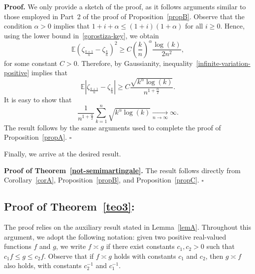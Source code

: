 \documentclass[preprint,12pt,authoryear]{elsarticle}
\def\E{\mathbb{E}}
\begin{document}
\noindent\textbf{Proof.} We only provide a sketch of the proof, as it follows arguments similar to those employed in Part~2 of the proof of Proposition~\ref{propB}. Observe that the condition $\alpha > 0$ implies that $1 + i + \alpha \leq (1 + i)(1 + \alpha)$ for all $i \geq 0$. Hence, using the lower bound in~\eqref{gorostiza-key}, we obtain
\begin{equation}\label{infinite-variation-positive}
   \E\left(\zeta_{\frac{k+1}{n}}-\zeta_{\frac{k}{n}}\right)^2 \geq C  \left(\frac{k}{n}\right)^{\alpha}\frac{\log(k)}{2n^2},
\end{equation}
for some constant $C > 0$. Therefore, by Gaussianity, inequality~\eqref{infinite-variation-positive} implies that
\begin{equation*}
   \E\left|\zeta_{\frac{k+1}{n}}-\zeta_{\frac{k}{n}}\right| \geq C \frac{\sqrt{k^\alpha\log(k)}}{n^{1+\frac{\alpha}{2}}}.
\end{equation*}
It is easy to show that
\[
\frac{1}{n^{1 + \frac{\alpha}{2}}} \sum_{k = 1}^{n} \sqrt{k^{\alpha} \log(k)} \xrightarrow[n \to \infty]{} \infty.
\]
The result follows by the same arguments used to complete the proof of Proposition~\ref{propA}.
\hfill$\square$

Finally, we arrive at the desired result.  

\noindent\textbf{Proof of Theorem~\ref{not-semimartingale}.} The result follows directly from Corollary~\ref{corA}, Proposition~\ref{propB}, and Proposition~\ref{propC}.
\hfill$\square$


\subsection*{Proof of Theorem~\ref{teo3}:} The proof relies on the auxiliary result stated in Lemma~\ref{lemA}.
Throughout this argument, we adopt the following notation: given two positive real-valued functions \( f \) and \( g \), we write \( f \asymp g \) if there exist constants \( c_1, c_2 > 0 \) such that \( c_1 f \leq g \leq c_2 f \). Observe that if \( f \asymp g \) holds with constants \( c_1 \) and \( c_2 \), then \( g \asymp f \) also holds, with constants \( c_2^{-1} \) and \( c_1^{-1} \).



\end{document}
